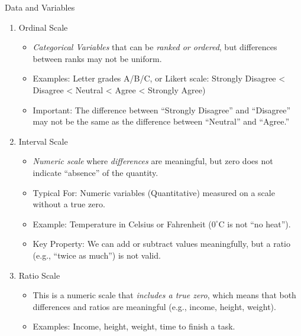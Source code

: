 \documentclass[8pt, usepdftitle=false]{beamer}
\begin{document}
\begin{frame}[allowframebreaks]{Data and Variables}
\begin{itemize}
\begin{enumerate}
\begin{itemize}
\end{itemize}
\medskip
\item \alert{Ordinal Scale}
\medskip
\begin{itemize}
\item \emph{Categorical Variables} that can be \emph{ranked or ordered}, but differences between ranks may not be uniform.
\item Examples: Letter grades A/B/C, or Likert scale: Strongly Disagree < Disagree < Neutral < Agree < Strongly Agree)
\item Important: The difference between “Strongly Disagree” and “Disagree” may not be the same as the difference between “Neutral” and “Agree.”
\end{itemize}
\medskip
\item \alert{Interval Scale}
\medskip
\begin{itemize}
\item \emph{Numeric scale} where \emph{differences} are meaningful, but zero does not indicate “absence” of the quantity.
\item Typical For: Numeric variables (Quantitative) measured on a scale without a true zero.
\item Example: Temperature in Celsius or Fahrenheit ($0^{\circ}$C is not “no heat”).
\item Key Property: We can add or subtract values meaningfully, but a ratio (e.g., “twice as much”) is not valid.
\end{itemize}
\medskip
\item \alert{Ratio Scale}
\medskip
\begin{itemize}
  \item  This is a numeric scale that \emph{includes a true zero}, which means that both differences and ratios are meaningful (e.g., income, height, weight).
  \item Examples:   Income, height, weight, time to finish a task.
\end{itemize}


\end{enumerate}

\end{itemize}
\end{frame}
\end{document}
